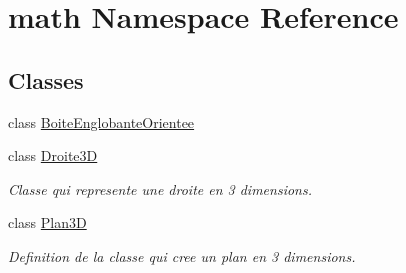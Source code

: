 \hypertarget{namespacemath}{\section{math Namespace Reference}
\label{namespacemath}
}
\subsection*{Classes}
\begin{DoxyCompactItemize}
\item 
class \hyperlink{classmath_1_1_boite_englobante_orientee}{Boite\-Englobante\-Orientee}
\item 
class \hyperlink{classmath_1_1_droite3_d}{Droite3\-D}
\begin{DoxyCompactList}\small\item\em Classe qui represente une droite en 3 dimensions. \end{DoxyCompactList}\item 
class \hyperlink{classmath_1_1_plan3_d}{Plan3\-D}
\begin{DoxyCompactList}\small\item\em Definition de la classe qui cree un plan en 3 dimensions. \end{DoxyCompactList}\end{DoxyCompactItemize}
